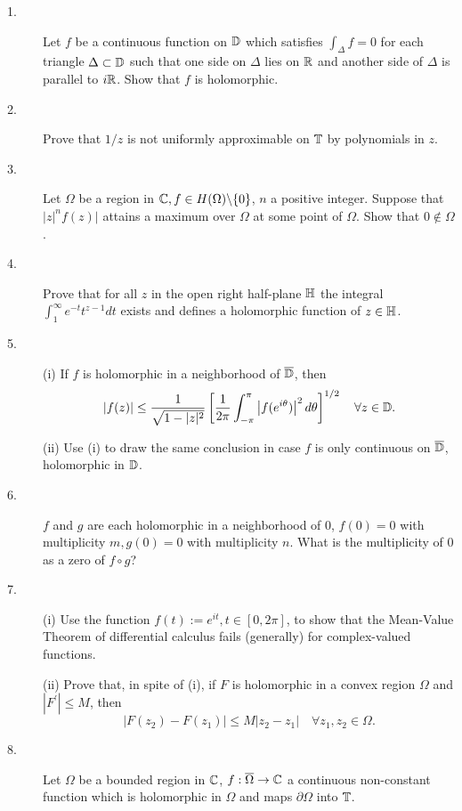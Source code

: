 \documentclass{article}
\begin{document}
\begin{description}
\item[1.]
Let $f$ be a continuous function on $\Bbb D$ which satisfies
$\int_\Delta f=0$ for each triangle $\Delta \subset \Bbb D$ such that one
side on $\Delta$ lies on $\Bbb R$ and another side of $\Delta$ is parallel
to $i\Bbb R$. Show that $f$ is holomorphic.

\item[2.]
Prove that $1 / z$ is not uniformly approximable on $\Bbb T$ by polynomials
in $z$.

\item[3.]
Let $\Omega$ be a region in $\Bbb C, f \in H(\Omega) \backslash \{0\}$, $n$
a positive integer. Suppose that $|z|^n f(z)|$ attains a maximum over
$\Omega$ at some point of $\Omega$. Show that $0 \notin \Omega$.

\item[4.]
Prove that for all $z$ in the open right half-plane $\Bbb H$ the integral
$\int^\infty_1 e^{-t} t^{z-1} dt$ exists and defines a holomorphic
function of $z \in \Bbb H$.

\item[5.] (i)
If $f$ is holomorphic in a neighborhood of $\overline{\Bbb D}$, then
$$|f(z)| \leq \frac{1}{\sqrt{1-|z|^2}} \left[\frac{1}{2\pi}
  \int^\pi_{-\pi} \left| f(e^{i\theta}) \right|^2 d \theta \right]^{1/2}
  \quad \forall z \in \Bbb D.$$

\item[\quad] (ii)
Use (i) to draw the same conclusion in case $f$ is only continuous on
$\overline{\Bbb D}$, holomorphic in $\Bbb D$.

\item[6.]
$f$ and $g$ are each holomorphic in a neighborhood of 0, $f(0) =0$ with
multiplicity $m, g(0) = 0$ with multiplicity $n$. What is the multiplicity of
0 as a zero of $f \circ g$?

\item[7.] (i)
Use the function $f(t) := e^{it}, t \in [0, 2\pi]$, to show that the
Mean-Value Theorem of differential calculus fails (generally) for
complex-valued functions.

\item[\quad] (ii)
Prove that, in spite of (i), if $F$ is holomorphic in a convex region
$\Omega$ and $|F^\prime | \leq M$, then
$$|F(z_2) - F(z_1)| \leq M |z_2 - z_1| \quad \forall z_1, z_2
  \in \Omega.$$

\item[8.]
Let $\Omega$ be a bounded region in $\Bbb C$,
$f :\overline \Omega \to \Bbb C$ a continuous non-constant function
which is holomorphic in $\Omega$ and maps $\partial \Omega$ into
$\Bbb T$.


\end{description}
\end{document}
